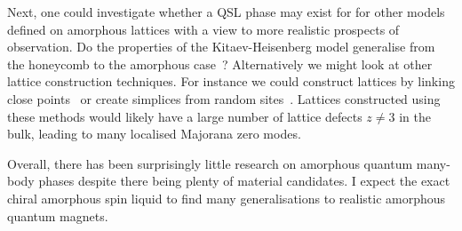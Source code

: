 Next, one could investigate whether a QSL phase may exist for for other models defined on amorphous lattices with a view to more realistic prospects of observation. Do the properties of the Kitaev-Heisenberg model generalise from the honeycomb to the amorphous case~\autocite{Chaloupka2010,Chaloupka2015,Jackeli2009,Kalmeyer1989,manousakisSpinTextonehalfHeisenberg1991}? Alternatively we might look at other lattice construction techniques. For instance we could construct lattices by linking close points~\autocite{agarwala2019topological} or create simplices from random sites~\autocite{christRandomLatticeField1982}. Lattices constructed using these methods would likely have a large number of lattice defects \(z \neq 3\) in the bulk, leading to many localised Majorana zero modes.

Overall, there has been surprisingly little research on amorphous quantum many-body phases despite there being plenty of material candidates. I expect the exact chiral amorphous spin liquid to find many generalisations to realistic amorphous quantum magnets.
